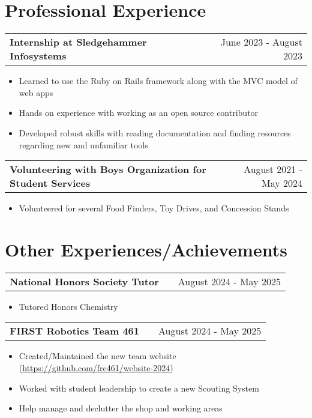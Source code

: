 \documentclass[letter, 12pt]{article}
\makeatletter
\newenvironment{jobshort}[2]
    {
    \begin{tabularx}{\linewidth}{@{}l X r@{}}
    \textbf{#1} & \hfill & #2 \\[3.75pt]
    \end{tabularx}
    }
    {
    }
\makeatother
\begin{document}
\section{Professional Experience}

\begin{jobshort}{Internship at Sledgehammer Infosystems}{June 2023 - August 2023}
    \begin{itemize}
        \item Learned to use the Ruby on Rails framework along with the MVC model of web apps
        \item Hands on experience with working as an open source contributor
        \item Developed robust skills with reading documentation and finding resources regarding new and unfamiliar tools
    \end{itemize}
\end{jobshort}

\begin{jobshort}{Volunteering with Boys Organization for Student Services}{August 2021 - May 2024}
    \begin{itemize}
        \item Volunteered for several Food Finders, Toy Drives, and Concession Stands
    \end{itemize}
\end{jobshort}

\section{Other Experiences/Achievements}

\begin{jobshort}{National Honors Society Tutor}{August 2024 - May 2025}
    \begin{itemize}
        \item Tutored Honors Chemistry
    \end{itemize}
\end{jobshort}

\begin{jobshort}{FIRST Robotics Team 461}{August 2024 - May 2025}
    \begin{itemize}
        \item Created/Maintained the new team website (\href{https://github.com/frc461/website-2024}{https://github.com/frc461/website-2024})
        \item Worked with student leadership to create a new Scouting System
        \item Help manage and declutter the shop and working areas
    \end{itemize}
\end{jobshort}
\end{document}
